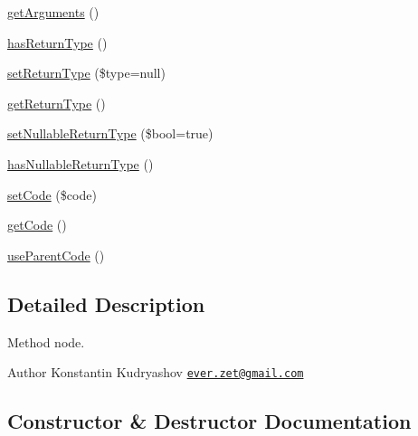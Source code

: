 \begin{DoxyCompactItemize}
\item 
\mbox{\hyperlink{class_prophecy_1_1_doubler_1_1_generator_1_1_node_1_1_method_node_a1d4c324c5a088be98d99d3efbf3502e1}{get\+Arguments}} ()
\item 
\mbox{\hyperlink{class_prophecy_1_1_doubler_1_1_generator_1_1_node_1_1_method_node_a9638837748e8f53a99d45f9a50e7eef9}{has\+Return\+Type}} ()
\item 
\mbox{\hyperlink{class_prophecy_1_1_doubler_1_1_generator_1_1_node_1_1_method_node_ad159af90a613282232074347398b46f0}{set\+Return\+Type}} (\$type=null)
\item 
\mbox{\hyperlink{class_prophecy_1_1_doubler_1_1_generator_1_1_node_1_1_method_node_a8d833642f3f98773f6ad2d64943be1b2}{get\+Return\+Type}} ()
\item 
\mbox{\hyperlink{class_prophecy_1_1_doubler_1_1_generator_1_1_node_1_1_method_node_a316a02e2c1cd4d3c4d37485701eae1fb}{set\+Nullable\+Return\+Type}} (\$bool=true)
\item 
\mbox{\hyperlink{class_prophecy_1_1_doubler_1_1_generator_1_1_node_1_1_method_node_abb8d1cdfe9c8e404539a6ffc5572dc83}{has\+Nullable\+Return\+Type}} ()
\item 
\mbox{\hyperlink{class_prophecy_1_1_doubler_1_1_generator_1_1_node_1_1_method_node_a8f47c2b8b20814580e86473b7d231f65}{set\+Code}} (\$code)
\item 
\mbox{\hyperlink{class_prophecy_1_1_doubler_1_1_generator_1_1_node_1_1_method_node_ab5e24da53b4a0d0848b18c1e832f47ff}{get\+Code}} ()
\item 
\mbox{\hyperlink{class_prophecy_1_1_doubler_1_1_generator_1_1_node_1_1_method_node_af8a819226e9296a7a36eb1c8d89a8e71}{use\+Parent\+Code}} ()
\end{DoxyCompactItemize}


\subsection{Detailed Description}
Method node.

\begin{DoxyAuthor}{Author}
Konstantin Kudryashov \href{mailto:ever.zet@gmail.com}{\tt ever.\+zet@gmail.\+com} 
\end{DoxyAuthor}


\subsection{Constructor \& Destructor Documentation}
\mbox{\label{class_prophecy_1_1_doubler_1_1_generator_1_1_node_1_1_method_node_af8248dffc35d1c0b50a9a116df956c47}} 
